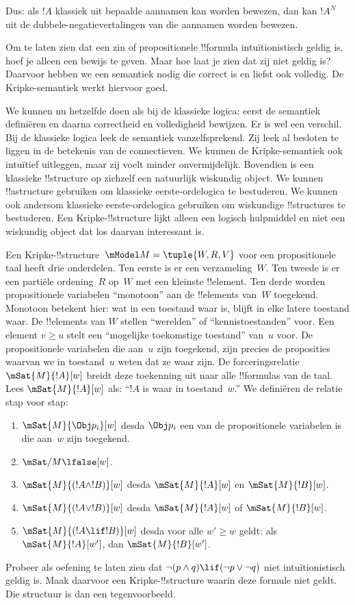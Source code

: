 \documentclass[openany]{memoir}
\begin{document}
Dus: als $!A$ klassiek uit bepaalde aannamen kan worden bewezen, dan kan
$!A^N$ uit de dubbele-negatievertalingen van die aannamen worden bewezen.

Om te laten zien dat een zin of propositionele !!{formula} intuïtionistisch
geldig is, hoef je alleen een bewijs te geven. Maar hoe laat je zien dat zij niet
geldig is? Daarvoor hebben we een semantiek nodig die correct is en liefst ook
volledig. De Kripke-semantiek werkt hiervoor goed.

We kunnen nu hetzelfde doen als bij de klassieke logica: eerst de semantiek
definiëren en daarna correctheid en volledigheid bewijzen. Er is wel een verschil.
Bij de klassieke logica leek de semantiek vanzelfsprekend. Zij leek al besloten
te liggen in de betekenis van de connectieven. We kunnen de Kripke-semantiek ook
intuïtief uitleggen, maar zij voelt minder onvermijdelijk. Bovendien is een
klassieke !!{structure} op zichzelf een natuurlijk wiskundig object. We kunnen
!!a{structure} gebruiken om klassieke eerste-ordelogica te bestuderen. We kunnen
ook andersom klassieke eerste-ordelogica gebruiken om wiskundige !!{structure}s
te bestuderen. Een Kripke-!!{structure} lijkt alleen een logisch hulpmiddel en
niet een wiskundig object dat los daarvan interessant is.

Een Kripke-!!{structure}~$\mModel M = \tuple{W, R, V}$ voor een propositionele
taal heeft drie onderdelen. Ten eerste is er een verzameling~$W$. Ten tweede is
er een partiële ordening~$R$ op~$W$ met een kleinste !!{element}. Ten derde
worden propositionele variabelen ``monotoon'' aan de !!{element}s van~$W$
toegekend. Monotoon betekent hier: wat in een toestand waar is, blijft in elke
latere toestand waar. De !!{element}s van $W$ stellen ``werelden'' of
``kennistoestanden'' voor. Een element $v \geq u$ stelt een ``mogelijke
toekomstige toestand'' van~$u$ voor. De propositionele variabelen die aan~$u$
zijn toegekend, zijn precies de proposities waarvan we in toestand~$u$ weten dat
ze waar zijn. De forceringsrelatie $\mSat{M}{!A}[w]$ breidt deze toekenning uit
naar alle !!{formula}s van de taal. Lees $\mSat{M}{!A}[w]$ als: ``$!A$ is waar
in toestand~$w$.'' We definiëren de relatie stap voor stap:
\begin{enumerate}
\item $\mSat{M}{\Obj p_i}[w]$ desda $\Obj p_i$ een van de propositionele
  variabelen is die aan~$w$ zijn toegekend.
\item $\mSat/{M}{\lfalse}[w]$.
\item $\mSat{M}{(!A \land !B)}[w]$ desda $\mSat{M}{!A}[w]$ en $\mSat{M}{!B}[w]$.
\item $\mSat{M}{(!A \lor !B)}[w]$ desda $\mSat{M}{!A}[w]$ of $\mSat{M}{!B}[w]$.
\item $\mSat{M}{(!A \lif !B)}[w]$ desda voor alle $w' \geq w$ geldt: als
  $\mSat{M}{!A}[w']$, dan $\mSat{M}{!B}[w']$.
\end{enumerate}
Probeer als oefening te laten zien dat $\lnot (p \land q) \lif
(\lnot p \lor \lnot q)$ niet intuïtionistisch geldig is. Maak daarvoor een
Kripke-!!{structure} waarin deze formule niet geldt. Die structuur is dan een
tegenvoorbeeld.
\endgroup
\end{document}
